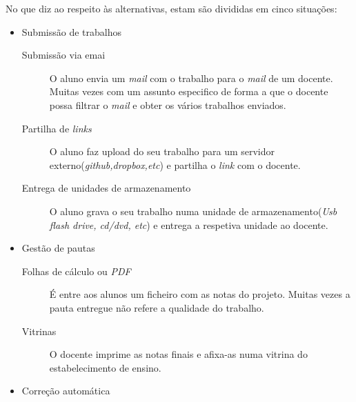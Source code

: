 No que diz ao respeito às alternativas, estam são divididas em cinco situações:
\begin{itemize}
	\item Submissão de trabalhos

	\begin{description}
		\item[Submissão via emai] O aluno envia um \emph{mail} com o trabalho para o \emph{mail} de um docente. Muitas vezes com um assunto especifico de forma a que o docente possa filtrar o \emph{mail} e obter os vários trabalhos enviados.
		\item[Partilha de \emph{links}] O aluno faz upload do seu trabalho para um servidor externo(\emph{github,dropbox,etc}) e partilha o \emph{link} com o docente.
		\item[Entrega de unidades de armazenamento] O aluno grava o seu trabalho numa unidade de armazenamento(\emph{Usb flash drive, cd/dvd, etc}) e entrega a respetiva unidade ao docente.
	\end{description}

	\item Gestão de pautas

	\begin{description}
		\item[Folhas de cálculo ou \emph{PDF}] É entre aos alunos um ficheiro com as notas do projeto. Muitas vezes a pauta entregue não refere a qualidade do trabalho.
		\item[Vitrinas] O docente imprime as notas finais e afixa-as numa vitrina do estabelecimento de ensino.
	\end{description}

	\item Correção automática


\end{itemize}
